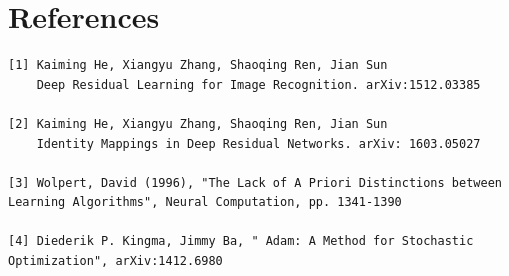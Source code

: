 \documentclass[12pt,twoside]{article}
\begin{document}
\newpage
\section{References}

\begin{verbatim}
[1] Kaiming He, Xiangyu Zhang, Shaoqing Ren, Jian Sun
    Deep Residual Learning for Image Recognition. arXiv:1512.03385

[2] Kaiming He, Xiangyu Zhang, Shaoqing Ren, Jian Sun
    Identity Mappings in Deep Residual Networks. arXiv: 1603.05027
    
[3] Wolpert, David (1996), "The Lack of A Priori Distinctions between Learning Algorithms", Neural Computation, pp. 1341-1390

[4] Diederik P. Kingma, Jimmy Ba, " Adam: A Method for Stochastic Optimization", arXiv:1412.6980
\end{verbatim}
\end{document}
